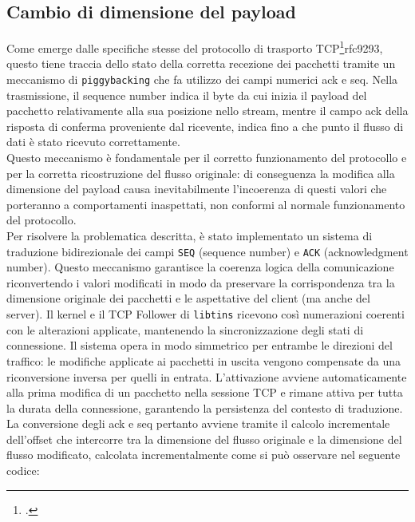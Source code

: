 \subsection{Cambio di dimensione del payload}

Come emerge dalle specifiche stesse del protocollo di trasporto TCP\footcite{RFC9293, Transmission Control Protocol (TCP)}{rfc9293}, questo tiene traccia dello stato della corretta recezione dei pacchetti tramite un meccanismo di \texttt{piggybacking} che fa utilizzo dei campi numerici ack e seq.
Nella trasmissione, il sequence number indica il byte da cui inizia il payload del pacchetto relativamente alla sua posizione nello stream, mentre il campo ack della risposta di conferma proveniente dal ricevente, indica fino a che punto il flusso di dati è stato ricevuto correttamente.\\
Questo meccanismo è fondamentale per il corretto funzionamento del protocollo e per la corretta ricostruzione del flusso originale: di conseguenza la modifica alla dimensione del payload causa inevitabilmente l'incoerenza di questi valori che porteranno a comportamenti inaspettati, non conformi al normale funzionamento del protocollo.\\

Per risolvere la problematica descritta, è stato implementato un sistema di traduzione bidirezionale dei campi \texttt{SEQ} (sequence number) e \texttt{ACK} (acknowledgment number).
Questo meccanismo garantisce la coerenza logica della comunicazione riconvertendo i valori modificati in modo da preservare la corrispondenza tra la dimensione originale dei pacchetti e le aspettative del client (ma anche del server).
Il kernel e il TCP Follower di \texttt{libtins} ricevono così numerazioni coerenti con le alterazioni applicate, mantenendo la sincronizzazione degli stati di connessione.
Il sistema opera in modo simmetrico per entrambe le direzioni del traffico: le modifiche applicate ai pacchetti in uscita vengono compensate da una riconversione inversa per quelli in entrata.
L'attivazione avviene automaticamente alla prima modifica di un pacchetto nella sessione TCP e rimane attiva per tutta la durata della connessione, garantendo la persistenza del contesto di traduzione.\\
La conversione degli ack e seq pertanto avviene tramite il calcolo incrementale dell'offset che intercorre tra la dimensione del flusso originale e la dimensione del flusso modificato,
calcolata incrementalmente come si può osservare nel seguente codice:


